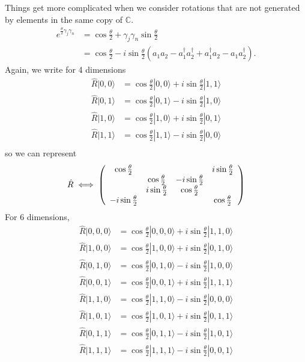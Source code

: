\documentclass{../mathnotes}
\begin{document}
Things get more complicated when we consider rotations that are not generated by elements in the same copy of $\mathbb{C}$.
\begin{align*}
    e^{\frac{\theta}{2}\gamma_j\gamma_n}&=\cos\frac{\theta}{2}+\gamma_j\gamma_n\sin\frac{\theta}{2}\\
    &=\cos\frac{\theta}{2}-i\sin\frac{\theta}{2}\left( a_1a_2-a_1^\dagger a_2^\dagger+a_1^\dagger a_2 -a_1a_2^\dagger \right).
\end{align*}
Again, we write for 4 dimensions
\begin{align*}
    \hat R|0,0\rangle&=\cos\frac{\theta}{2}|0,0\rangle + i\sin\frac{\theta}{2}|1,1\rangle\\
    \hat R|0,1\rangle&=\cos\frac{\theta}{2}|0,1\rangle - i\sin\frac{\theta}{2}|1,0\rangle\\
    \hat R|1,0\rangle&=\cos\frac{\theta}{2}|1,0\rangle + i\sin\frac{\theta}{2}|0,1\rangle\\
    \hat R|1,1\rangle&=\cos\frac{\theta}{2}|1,1\rangle - i\sin\frac{\theta}{2}|0,0\rangle\\
\end{align*}
so we can represent
\begin{align*}
    \hat R \iff
    \left(
    \begin{array}[]{cccc}
        \cos\frac{\theta}{2} &  &  &i\sin\frac{\theta}{2} \\
        & \cos\frac{\theta}{2} & -i\sin\frac{\theta}{2} & \\
        & i\sin\frac{\theta}{2} & \cos\frac{\theta}{2} & \\
        -i\sin\frac{\theta}{2}&  &  & \cos\frac{\theta}{2}
    \end{array}
    \right)
\end{align*}
For 6 dimensions,
\begin{align*}
    \hat R|0,0,0\rangle&=\cos\frac{\theta}{2}|0,0,0\rangle+i\sin\frac{\theta}{2}|1,1,0\rangle\\
    \hat R|1,0,0\rangle&=\cos\frac{\theta}{2}|1,0,0\rangle+i\sin\frac{\theta}{2}|0,1,0\rangle\\
    \hat R|0,1,0\rangle&=\cos\frac{\theta}{2}|0,1,0\rangle-i\sin\frac{\theta}{2}|1,0,0\rangle\\
    \hat R|0,0,1\rangle&=\cos\frac{\theta}{2}|0,0,1\rangle+i\sin\frac{\theta}{2}|1,1,1\rangle\\
    \hat R|1,1,0\rangle&=\cos\frac{\theta}{2}|1,1,0\rangle-i\sin\frac{\theta}{2}|0,0,0\rangle\\
    \hat R|1,0,1\rangle&=\cos\frac{\theta}{2}|1,0,1\rangle+i\sin\frac{\theta}{2}|0,1,1\rangle\\
    \hat R|0,1,1\rangle&=\cos\frac{\theta}{2}|0,1,1\rangle-i\sin\frac{\theta}{2}|1,0,1\rangle\\
    \hat R|1,1,1\rangle&=\cos\frac{\theta}{2}|1,1,1\rangle-i\sin\frac{\theta}{2}|0,0,1\rangle\\
\end{align*}
\end{document}
